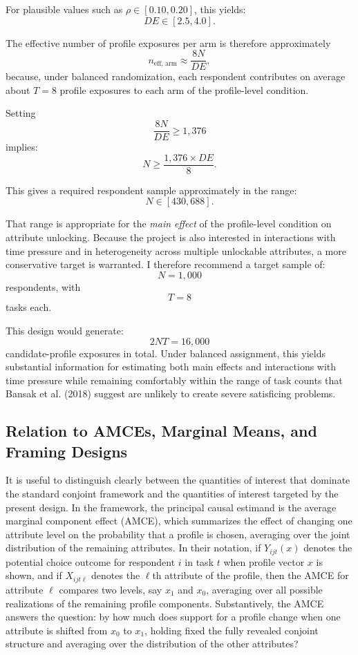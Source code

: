 \documentclass[11pt]{article}
\begin{document}
For plausible values such as $\rho \in [0.10, 0.20]$, this yields:
\[
DE \in [2.5, 4.0].
\]

The effective number of profile exposures per arm is therefore approximately
\[
n_{\text{eff, arm}} \approx \frac{8N}{DE},
\]
because, under balanced randomization, each respondent contributes on average about $T=8$ profile exposures to each arm of the profile-level condition.

Setting
\[
\frac{8N}{DE} \geq 1{,}376
\]
implies:
\[
N \geq \frac{1{,}376 \times DE}{8}.
\]

This gives a required respondent sample approximately in the range:
\[
N \in [430, 688].
\]

That range is appropriate for the \emph{main effect} of the profile-level condition on attribute unlocking. Because the project is also interested in interactions with time pressure and in heterogeneity across multiple unlockable attributes, a more conservative target is warranted. I therefore recommend a target sample of:
\[
N = 1{,}000
\]
respondents, with
\[
T = 8
\]
tasks each.

This design would generate:
\[
2NT = 16{,}000
\]
candidate-profile exposures in total. Under balanced assignment, this yields substantial information for estimating both main effects and interactions with time pressure while remaining comfortably within the range of task counts that Bansak et al. (2018) suggest are unlikely to create severe satisficing problems.

\subsection*{Relation to AMCEs, Marginal Means, and Framing Designs}

It is useful to distinguish clearly between the quantities of interest that dominate the standard conjoint framework and the quantities of interest targeted by the present design. In the \textcite{Hainmueller2014} framework, the principal causal estimand is the average marginal component effect (AMCE), which summarizes the effect of changing one attribute level on the probability that a profile is chosen, averaging over the joint distribution of the remaining attributes. In their notation, if $Y_{ijt}(x)$ denotes the potential choice outcome for respondent $i$ in task $t$ when profile vector $x$ is shown, and if $X_{ijt\ell}$ denotes the $\ell$th attribute of the profile, then the AMCE for attribute $\ell$ compares two levels, say $x_1$ and $x_0$, averaging over all possible realizations of the remaining profile components. Substantively, the AMCE answers the question: by how much does support for a profile change when one attribute is shifted from $x_0$ to $x_1$, holding fixed the fully revealed conjoint structure and averaging over the distribution of the other attributes?
\end{document}

